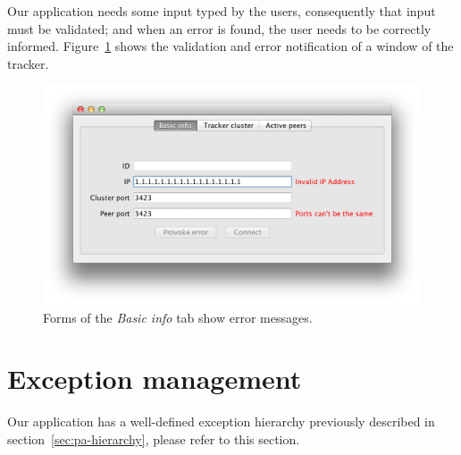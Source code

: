 \documentclass[twoside,a4paper,10pt]{article}
\begin{document}
Our application needs some input typed by the users, consequently that input
must be validated; and when an error is found, the user needs to be correctly
informed. Figure~\ref{fig:validation}
shows the validation and error notification of a window of the tracker.

\begin{figure}[!htp]
  \centering
  \includegraphics[width=\textwidth]{imgs/form_validation.png}
  \caption{\label{fig:validation}Forms of the \emph{Basic info} tab show
    error messages.}
\end{figure}

\FloatBarrier

\section{Exception management}

Our application has a well-defined exception hierarchy previously described
in section~\ref{sec:pa-hierarchy}, please refer to this section.

%
%
\end{document}

